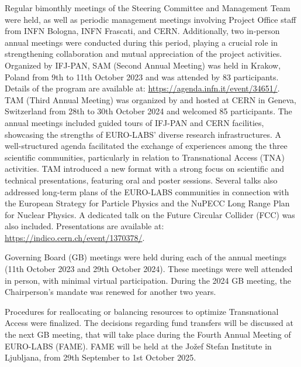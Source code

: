 Regular bimonthly meetings of the Steering Committee and Management Team were held, as well as periodic management meetings involving Project Office staff from INFN Bologna, INFN Frascati, and CERN. Additionally, two in-person annual meetings were conducted during this period, playing a crucial role in strengthening collaboration and mutual appreciation of the project activities. Organized by IFJ-PAN, SAM (Second Annual Meeting) was held in Krakow, Poland from 9th to 11th October 2023 and was attended by 83 participants. Details of the program are available at:
    \url{https://agenda.infn.it/event/34651/}.
TAM (Third Annual Meeting) was organized by and hosted at CERN in Geneva, Switzerland from 28th to 30th October 2024 and welcomed 85 participants. The annual meetings included guided tours of IFJ-PAN and CERN facilities, showcasing the strengths of EURO-LABS' diverse research infrastructures. A well-structured agenda facilitated the exchange of experiences among the three scientific communities, particularly in relation to Transnational Access (TNA) activities. TAM introduced a new format with a strong focus on scientific and technical presentations, featuring oral and poster sessions. Several talks also addressed long-term plans of the EURO-LABS communities in connection with the European Strategy for Particle Physics and the NuPECC Long Range Plan for Nuclear Physics. A dedicated talk on the Future Circular Collider (FCC) was also included. Presentations are available at:
\url{https://indico.cern.ch/event/1370378/}.

Governing Board (GB) meetings were held during each of the annual meetings (11th October 2023 and 29th October 2024). These meetings were well attended in person, with minimal virtual participation. During the 2024 GB meeting, the Chairperson’s mandate was renewed for another two years.

Procedures for reallocating or balancing resources to optimize Transnational Access were finalized. The decisions regarding fund transfers will be discussed at the next GB meeting, that will take place during the Fourth Annual Meeting of EURO-LABS (FAME).  FAME will be held at the Jožef Stefan Institute in Ljubljana, from 29th September to 1st October 2025.




